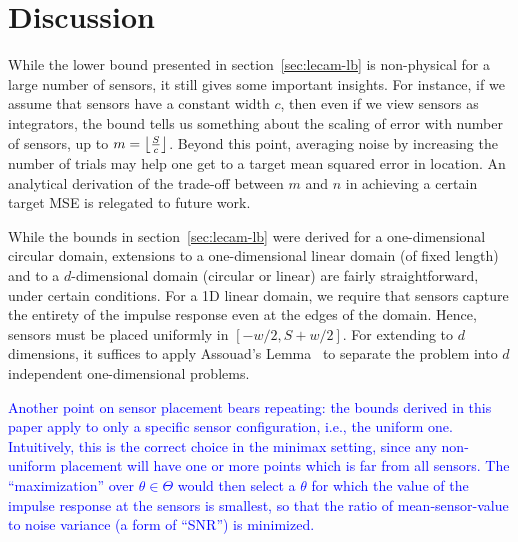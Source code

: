 \documentclass[conference]{IEEEtran}
\DeclarePairedDelimiter\abs{\lvert}{\rvert}
\DeclarePairedDelimiter\floor{\lfloor}{\rfloor}
\begin{document}
\section{Discussion}
\label{sec:discussion}

While the lower bound presented in section~\ref{sec:lecam-lb} is non-physical
for a large number of sensors, it still gives some important insights. For
instance, if we assume that sensors have a constant width $c$, then even if we
view sensors as integrators, the bound tells us something about the scaling of
error with number of sensors, up to $m = \floor*{\frac{S}{c}}$. Beyond this
point, averaging noise by increasing the number of trials may help one get to a
target mean squared error in location. An analytical derivation of the
trade-off between $m$ and $n$ in achieving a certain target MSE is relegated to
future work.

While the bounds in section~\ref{sec:lecam-lb} were derived for a
one-dimensional circular domain, extensions to a one-dimensional linear domain
(of fixed length) and to a $d$-dimensional domain (circular or linear) are
fairly straightforward, under certain conditions. For a 1D linear domain, we
require that sensors capture the entirety of the impulse response even at the
edges of the domain. Hence, sensors must be placed uniformly in $[-w/2,
S{+}w/2]$. For extending to $d$ dimensions, it suffices to apply Assouad's
Lemma~\cite{Tsybakov2009Introduction} to separate the problem into $d$
independent one-dimensional problems.

\textcolor{blue}{
Another point on sensor placement bears repeating: the bounds derived in this
paper apply to only a specific sensor configuration, i.e., the uniform one.
Intuitively, this is the correct choice in the minimax setting, since any
non-uniform placement will have one or more points which is far from all
sensors. The ``maximization'' over $\theta \in \Theta$ would then select a
$\theta$ for which the value of the impulse response at the sensors is
smallest, so that the ratio of mean-sensor-value to noise variance (a form of
``SNR'') is minimized.
}





\end{document}
